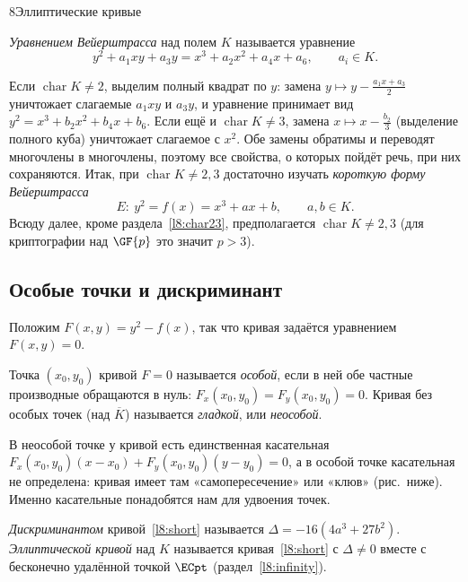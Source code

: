 \begin{lecture}{8}{Эллиптические кривые}
\begin{definition}
\emph{Уравнением Вейерштрасса} над полем $K$ называется уравнение
\begin{equation}\label{l8:general}
  y^2 + a_1 xy + a_3 y = x^3 + a_2 x^2 + a_4 x + a_6, \qquad a_i \in K.
\end{equation}
\end{definition}

Если $\operatorname{char} K \ne 2$, выделим полный квадрат по $y$: замена
$y \mapsto y - \frac{a_1 x + a_3}{2}$ уничтожает слагаемые $a_1 xy$ и $a_3 y$, и уравнение
принимает вид $y^2 = x^3 + b_2 x^2 + b_4 x + b_6$. Если ещё и $\operatorname{char} K \ne 3$,
замена $x \mapsto x - \frac{b_2}{3}$ (выделение полного куба) уничтожает слагаемое с $x^2$.
Обе замены обратимы и переводят многочлены в многочлены, поэтому все свойства, о которых пойдёт
речь, при них сохраняются. Итак, при $\operatorname{char} K \ne 2, 3$ достаточно изучать
\emph{короткую форму Вейерштрасса}
\begin{equation}\label{l8:short}
  E\colon\ y^2 = f(x) = x^3 + ax + b, \qquad a, b \in K.
\end{equation}
Всюду далее, кроме раздела~\ref{l8:char23}, предполагается $\operatorname{char} K \ne 2, 3$
(для криптографии над $\GF{p}$ это значит $p > 3$).

\subsection{Особые точки и дискриминант}

Положим $F(x, y) = y^2 - f(x)$, так что кривая задаётся уравнением $F(x, y) = 0$.

\begin{definition}
Точка $(x_0, y_0)$ кривой $F = 0$ называется \emph{особой}, если в ней обе частные производные
обращаются в нуль: $F_x(x_0, y_0) = F_y(x_0, y_0) = 0$. Кривая без особых точек (над
$\overline K$) называется \emph{гладкой}, или \emph{неособой}.
\end{definition}

В неособой точке у кривой есть единственная касательная
$F_x(x_0, y_0)(x - x_0) + F_y(x_0, y_0)(y - y_0) = 0$, а в особой точке касательная не
определена: кривая имеет там «самопересечение» или «клюв» (рис.~ниже). Именно касательные
понадобятся нам для удвоения точек.

\begin{definition}
\emph{Дискриминантом} кривой~\eqref{l8:short} называется $\Delta = -16(4a^3 + 27b^2)$.
\emph{Эллиптической кривой} над $K$ называется кривая~\eqref{l8:short} с $\Delta \ne 0$ вместе
с бесконечно удалённой точкой $\ECpt$ (раздел~\ref{l8:infinity}).
\end{definition}


\end{lecture}
